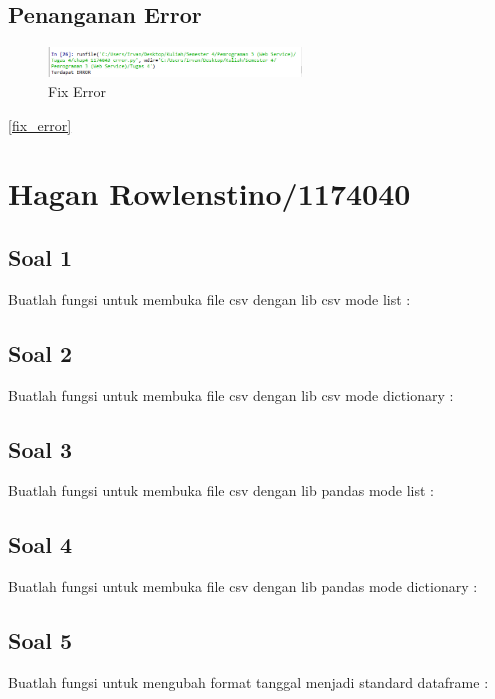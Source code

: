 	\subsection{Penanganan Error}
		
		\begin{figure} [ht]
			\centerline{\includegraphics[width=0.6\textwidth]{figures/4/1174043/Praktek/fix_error.png}}
			\caption{Fix Error}
			\label{Fix Error}
		\end{figure}

		\ref{fix_error}

\section{Hagan Rowlenstino/1174040}
\subsection{Soal 1}
Buatlah fungsi untuk membuka file csv dengan lib csv mode list : 


\subsection{Soal 2}
Buatlah fungsi untuk membuka file csv dengan lib csv mode dictionary : 


\subsection{Soal 3}
Buatlah fungsi  untuk membuka file csv dengan lib pandas mode list : 


\subsection{Soal 4}
Buatlah fungsi  untuk membuka file csv dengan lib pandas mode dictionary : 


\subsection{Soal 5}
Buatlah fungsi untuk mengubah format tanggal menjadi standard dataframe : 


